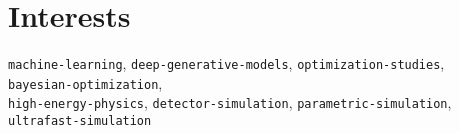 \section*{Interests}
\begin{cvcontent}
  \texttt{machine-learning},
  \texttt{deep-generative-models},
  \texttt{optimization-studies},
  \texttt{bayesian-optimization},\\
  \texttt{high-energy-physics},
  \texttt{detector-simulation},
  \texttt{parametric-simulation},
  \texttt{ultrafast-simulation}
\end{cvcontent}